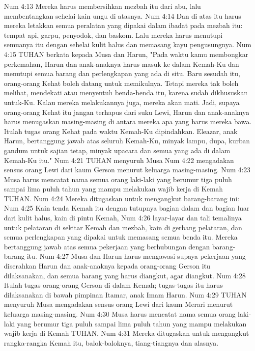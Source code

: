 Num 4:13  Mereka harus membersihkan mezbah itu dari abu, lalu membentangkan sehelai kain ungu di atasnya.
Num 4:14  Dan di atas itu harus mereka letakkan semua peralatan yang dipakai dalam ibadat pada mezbah itu: tempat api, garpu, penyodok, dan baskom. Lalu mereka harus menutupi semuanya itu dengan sehelai kulit halus dan memasang kayu pengusungnya.
Num 4:15  TUHAN berkata kepada Musa dan Harun, "Pada waktu kamu membongkar perkemahan, Harun dan anak-anaknya harus masuk ke dalam Kemah-Ku dan menutupi semua barang dan perlengkapan yang ada di situ. Baru sesudah itu, orang-orang Kehat boleh datang untuk memikulnya. Tetapi mereka tak boleh melihat, mendekati atau menyentuh benda-benda itu, karena sudah dikhususkan untuk-Ku. Kalau mereka melakukannya juga, mereka akan mati. Jadi, supaya orang-orang Kehat itu jangan terhapus dari suku Lewi, Harun dan anak-anaknya harus menugaskan masing-masing di antara mereka apa yang harus mereka bawa. Itulah tugas orang Kehat pada waktu Kemah-Ku dipindahkan. Eleazar, anak Harun, bertanggung jawab atas seluruh Kemah-Ku, minyak lampu, dupa, kurban gandum untuk sajian tetap, minyak upacara dan semua yang ada di dalam Kemah-Ku itu."
Num 4:21  TUHAN menyuruh Musa
Num 4:22  mengadakan sensus orang Lewi dari kaum Gerson menurut keluarga masing-masing.
Num 4:23  Musa harus mencatat nama semua orang laki-laki yang berumur tiga puluh sampai lima puluh tahun yang mampu melakukan wajib kerja di Kemah TUHAN.
Num 4:24  Mereka ditugaskan untuk mengangkut barang-barang ini:
Num 4:25  Kain tenda Kemah itu dengan tutupnya bagian dalam dan bagian luar dari kulit halus, kain di pintu Kemah,
Num 4:26  layar-layar dan tali temalinya untuk pelataran di sekitar Kemah dan mezbah, kain di gerbang pelataran, dan semua perlengkapan yang dipakai untuk memasang semua benda itu. Mereka bertanggung jawab atas semua pekerjaan yang berhubungan dengan barang-barang itu.
Num 4:27  Musa dan Harun harus mengawasi supaya pekerjaan yang diserahkan Harun dan anak-anaknya kepada orang-orang Gerson itu dilaksanakan, dan semua barang yang harus diangkut, agar diangkut.
Num 4:28  Itulah tugas orang-orang Gerson di dalam Kemah; tugas-tugas itu harus dilaksanakan di bawah pimpinan Itamar, anak Imam Harun.
Num 4:29  TUHAN menyuruh Musa mengadakan sensus orang Lewi dari kaum Merari menurut keluarga masing-masing.
Num 4:30  Musa harus mencatat nama semua orang laki-laki yang berumur tiga puluh sampai lima puluh tahun yang mampu melakukan wajib kerja di Kemah TUHAN.
Num 4:31  Mereka ditugaskan untuk mengangkut rangka-rangka Kemah itu, balok-baloknya, tiang-tiangnya dan alasnya.
